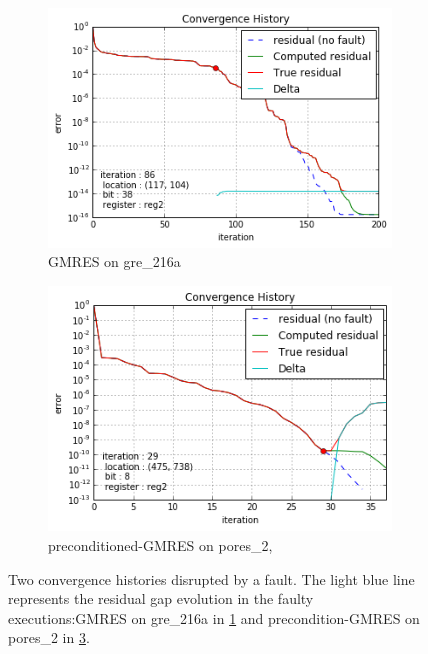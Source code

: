 \begin{figure}[h]
	\centering
	\begin{subfigure}[t]{0.45\linewidth}
		\centering
		\includegraphics[width=1.1\linewidth]{figures/gre_216a/convergence_history_delta.png}
		\caption{GMRES on gre_216a}\label{fig:gre_216a_conv_hist_delta}		
	\end{subfigure}
	\quad
	\begin{subfigure}[t]{0.45\linewidth}
		\centering
		\includegraphics[width=1.1\linewidth]{figures/pores_2/convergence_history_delta.png}
		\caption{preconditioned-GMRES on pores_2, }\label{fig:pores_2_conv_hist_delta}
	\end{subfigure}
    \caption{Two convergence histories disrupted by a fault. The light blue line represents the residual gap evolution in the faulty executions:GMRES on gre_216a in \ref{fig:gre_216a_conv_hist_delta} and precondition-GMRES  on pores_2 in \ref{fig:pores_2_conv_hist_delta}.}
\end{figure}



